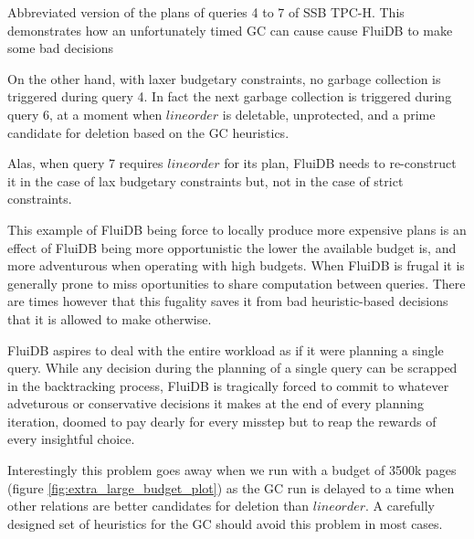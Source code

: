 \begin{code}
\begin{verbatim}
\end{verbatim}
  \caption{\label{fig:reverse_operations}Abbreviated version of the
    plans of queries 4 to 7 of SSB TPC-H. This demonstrates how an
    unfortunately timed GC can cause cause FluiDB to make some bad decisions}

\end{code}


On the other hand, with laxer budgetary constraints, no garbage
collection is triggered during query 4. In fact the next garbage
collection is triggered during query 6, at a moment when
\(\mathit{lineorder}\) is deletable, unprotected, and a prime
candidate for deletion based on the GC heuristics.

Alas, when query 7 requires \(\mathit{lineorder}\) for its plan,
FluiDB needs to re-construct it in the case of lax budgetary
constraints but, not in the case of strict constraints.

This example of FluiDB being force to locally produce more expensive
plans is an effect of FluiDB being more opportunistic the lower the
available budget is, and more adventurous when operating with high
budgets. When FluiDB is frugal it is generally prone to miss
oportunities to share computation between queries. There are times
however that this fugality saves it from bad heuristic-based decisions
that it is allowed to make otherwise.

FluiDB aspires to deal with the entire workload as if it were planning
a single query. While any decision during the planning of a single
query can be scrapped in the backtracking process, FluiDB is
tragically forced to commit to whatever adveturous or conservative
decisions it makes at the end of every planning iteration, doomed to
pay dearly for every misstep but to reap the rewards of every
insightful choice.

Interestingly this problem goes away when we run with a budget of
3500k pages (figure \ref{fig:extra_large_budget_plot}) as the GC run
is delayed to a time when other relations are better candidates for
deletion than \(\mathit{lineorder}\). A carefully designed set of
heuristics for the GC should avoid this problem in most cases.

